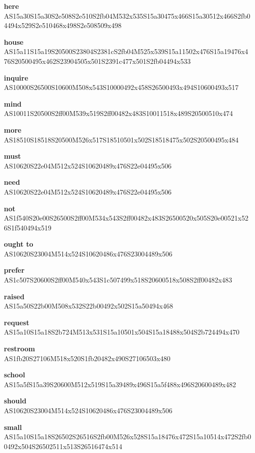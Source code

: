 \documentclass{article}
\begin{document}
\begin{glossary}
\textbf{here}\\
AS15a30S15a30S2e508S2e510S2fb04M532x535S15a30475x466S15a30512x466S2fb04494x529S2e510468x498S2e508509x498

\textbf{house}\\
AS15a11S15a19S20500S23804S2381cS2fb04M525x539S15a11502x476S15a19476x476S20500495x462S23904505x501S2391c477x501S2fb04494x533

\textbf{inquire}\\
AS10000S26500S10600M508x543S10000492x458S26500493x494S10600493x517

\textbf{mind}\\
AS10011S20500S2ff00M539x519S2ff00482x483S10011518x489S20500510x474

\textbf{more}\\
AS18510S18518S20500M526x517S18510501x502S18518475x502S20500495x484

\textbf{must}\\
AS10620S22e04M512x524S10620489x476S22e04495x506

\textbf{need}\\
AS10620S22e04M512x524S10620489x476S22e04495x506

\textbf{not}\\
AS1f540S20e00S26500S2ff00M534x543S2ff00482x483S26500520x505S20e00521x526S1f540494x519

\textbf{ought to}\\
AS10620S23004M514x524S10620486x476S23004489x506

\textbf{prefer}\\
AS1c507S20600S2ff00M540x543S1c507499x518S20600518x508S2ff00482x483

\textbf{raised}\\
AS15a50S22b00M508x532S22b00492x502S15a50494x468

\textbf{request}\\
AS15a10S15a18S2b724M513x531S15a10501x504S15a18488x504S2b724494x470

\textbf{restroom}\\
AS1fb20S27106M518x520S1fb20482x490S27106503x480

\textbf{school}\\
AS15a5fS15a39S20600M512x519S15a39489x496S15a5f488x496S20600489x482

\textbf{should}\\
AS10620S23004M514x524S10620486x476S23004489x506

\textbf{small}\\
AS15a10S15a18S26502S26516S2fb00M526x528S15a18476x472S15a10514x472S2fb00492x504S26502511x513S26516474x514


\end{glossary}
\end{document}
